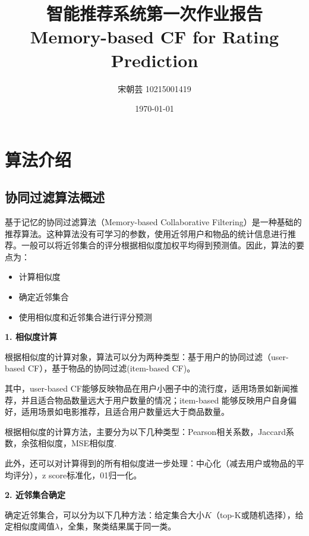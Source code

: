 \documentclass[12pt, a4paper]{ctexart}
\title{\textbf{智能推荐系统第一次作业报告}\\
Memory-based CF for Rating Prediction}
\author{宋朝芸 10215001419}
\date{\today}
\begin{document}
\maketitle

\setcounter{page}{0}
\maketitle
\thispagestyle{empty}


\setcounter{page}{1}
\tableofcontents
\newpage
\setcounter{page}{1}

\section{算法介绍}

\subsection{协同过滤算法概述}


基于记忆的协同过滤算法（Memory-based Collaborative Filtering）是一种基础的推荐算法。这种算法没有可学习的参数，使用近邻用户和物品的统计信息进行推荐。一般可以将近邻集合的评分根据相似度加权平均得到预测值。因此，算法的要点为：
\begin{itemize}
    \item 计算相似度
    \item 确定近邻集合
    \item 使用相似度和近邻集合进行评分预测
\end{itemize}


\textbf{1. 相似度计算}

根据相似度的计算对象，算法可以分为两种类型：基于用户的协同过滤（user-based CF），基于物品的协同过滤(item-based CF)。

其中，user-based CF能够反映物品在用户小圈子中的流行度，适用场景如新闻推荐，并且适合物品数量远大于用户数量的情况；item-based 能够反映用户自身偏好，适用场景如电影推荐，且适合用户数量远大于商品数量。

根据相似度的计算方法，主要分为以下几种类型：Pearson相关系数，Jaccard系数，余弦相似度，MSE相似度.

此外，还可以对计算得到的所有相似度进一步处理：中心化（减去用户或物品的平均评分），z score标准化，01归一化。

\textbf{2. 近邻集合确定}

确定近邻集合，可以分为以下几种方法：给定集合大小$K$（top-K或随机选择），给定相似度阈值$\lambda$，全集，聚类结果属于同一类。
\end{document}
